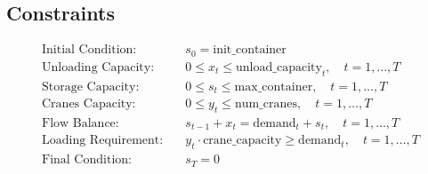 \documentclass{article}
\begin{document}
\subsection*{Constraints}
\begin{align}
    \text{Initial Condition:} & \quad s_0 = \text{init\_container} \\
    \text{Unloading Capacity:} & \quad 0 \leq x_t \leq \text{unload\_capacity}_t, \quad t = 1, \ldots, T \\
    \text{Storage Capacity:} & \quad 0 \leq s_t \leq \text{max\_container}, \quad t = 1, \ldots, T \\
    \text{Cranes Capacity:} & \quad 0 \leq y_t \leq \text{num\_cranes}, \quad t = 1, \ldots, T \\
    \text{Flow Balance:} & \quad s_{t-1} + x_t = \text{demand}_t + s_t, \quad t = 1, \ldots, T \\
    \text{Loading Requirement:} & \quad y_t \cdot \text{crane\_capacity} \geq \text{demand}_t, \quad t = 1, \ldots, T \\
    \text{Final Condition:} & \quad s_T = 0
\end{align}
\end{document}
